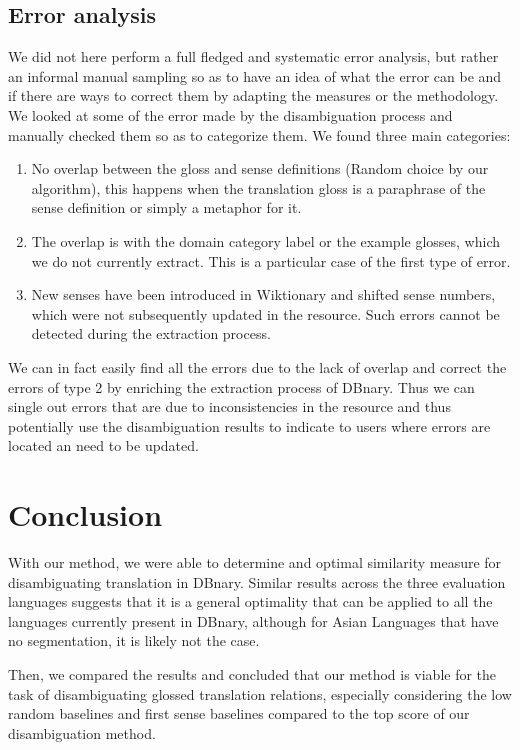 \documentclass[10pt,a4paper,twoside]{article}
\begin{document}
\subsection{Error analysis}

We did not here perform a full fledged and systematic error analysis, but rather an informal manual sampling so as to have an idea of what the error can be and if there are ways to correct them by adapting the measures or the methodology.
We looked at some of the error made by the disambiguation process and manually checked them so as to categorize them. We found three main categories:
\begin{enumerate}
\item No overlap between the gloss and sense definitions (Random choice by our algorithm), this happens when the translation gloss is a paraphrase of the sense definition or simply a metaphor for it.
\item The overlap is with the domain category label or the example glosses, which we do not currently extract. This is a particular case of the first type of error.
\item New senses have been introduced in Wiktionary and shifted sense numbers, which were not subsequently updated in the resource. Such errors cannot be detected during the extraction process.
\end{enumerate}

We can in fact easily find all the errors due to the lack of overlap and correct the errors of type 2 by enriching the extraction process of DBnary. Thus we can single out errors that are due to inconsistencies in the resource and thus potentially use the disambiguation results to indicate to users where errors are located an need to be updated.

\section{Conclusion}

With our method, we were able to determine and optimal similarity measure for disambiguating translation in DBnary. Similar results across the three evaluation languages suggests that it is a general optimality that can be applied to all the languages currently present in DBnary, although for Asian Languages that have no segmentation, it is likely not the case.

Then, we compared the results and concluded that our method is viable for the task of disambiguating glossed translation relations, especially considering the low random baselines and first sense baselines compared to the top score of our disambiguation method.
\end{document}

